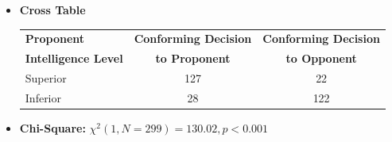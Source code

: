 \documentclass[11pt]{article}
\begin{document}
\begin{itemize}
    \item \textbf{Cross Table} \\[4pt]
    \begin{tabular}{l|cc}
        \hline
        \textbf{Proponent} & \textbf{Conforming Decision} & \textbf{Conforming Decision} \\
        \textbf{Intelligence Level} & \textbf{to Proponent} & \textbf{to Opponent} \\
        \hline
        Superior & 127 & 22 \\
        Inferior & 28 & 122 \\
        \hline
    \end{tabular}
    \item \textbf{Chi-Square:} \(\chi^2(1, N = 299) = 130.02, p < 0.001\)
\end{itemize}




\end{document}

